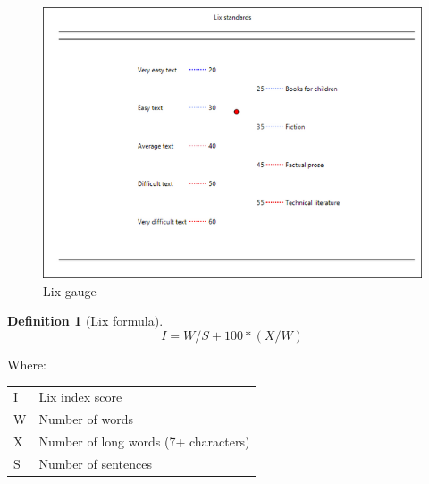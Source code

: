 \documentclass[
]{book}
\theoremstyle{definition}
\newtheorem{definition}{Definition}[chapter]
\theoremstyle{definition}
\theoremstyle{definition}
\theoremstyle{definition}
\theoremstyle{remark}
\begin{document}
\begin{figure}[H]

{\centering \includegraphics[width=0.75\linewidth,]{Images/LixGauge} 

}

\caption{Lix gauge}\label{fig:lixGauge}
\end{figure}

\begin{definition}[Lix formula]
\protect\hypertarget{def:lix}{}{\label{def:lix} {} }\[
I = W/S + 100*(X/W)
\]
\end{definition}

Where:

\begin{longtable}[]{@{}
  >{\raggedright\arraybackslash}p{}
  >{\raggedright\arraybackslash}p{}@{}}
\toprule
\endhead
I & Lix index score \\
W & Number of words \\
X & Number of long words (7+ characters) \\
S & Number of sentences \\
\bottomrule
\end{longtable}
\end{document}

